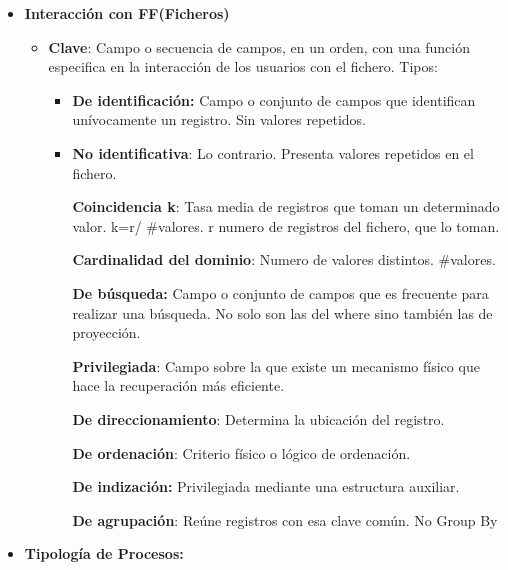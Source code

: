 \documentclass[12pt, twoside, openright]{report} %
\begin{document}
\begin{itemize}
\begin{itemize}
\begin{itemize}
        \end{itemize}
      \item \textbf{Interacción con FF(Ficheros)}
        

        \begin{itemize}
        \item \textbf{Clave}: Campo o secuencia de campos, en un orden, con
          una función especifica en la interacción de los usuarios con
          el fichero. Tipos:
          

          \begin{itemize}
          \item
            
            \textbf{De identificación:} Campo o conjunto de campos que
            identifican unívocamente un registro. Sin valores repetidos.
            
          \item
            
            \textbf{No identificativa}: Lo contrario. Presenta valores
            repetidos en el fichero.
            

            
			
              \textbf{Coincidencia k}: Tasa media de registros que toman
              un determinado valor. k=r/ \#valores. r numero de
              registros del fichero, que lo toman.
              
			  
              \textbf{Cardinalidad del dominio}: Numero de valores
              distintos. \#valores.
            
			  
            \textbf{De búsqueda:} Campo o conjunto de campos que es
            frecuente para realizar una búsqueda. No solo son las del
            where sino también las de proyección.
            
			
            \textbf{Privilegiada}: Campo sobre la que existe un
            mecanismo físico que hace la recuperación más eficiente.

           
              \textbf{De direccionamiento}: Determina la ubicación del
              registro.
             
              \textbf{De ordenación}: Criterio físico o lógico de
              ordenación.
              
              \textbf{De indización:} Privilegiada mediante una
              estructura auxiliar.
             
              \textbf{De agrupación}: Reúne registros con esa clave
              común. No Group By
          \end{itemize}
        \end{itemize}
      \item \textbf{Tipología de Procesos:}
        


\end{itemize}
\end{itemize}
\end{document}
